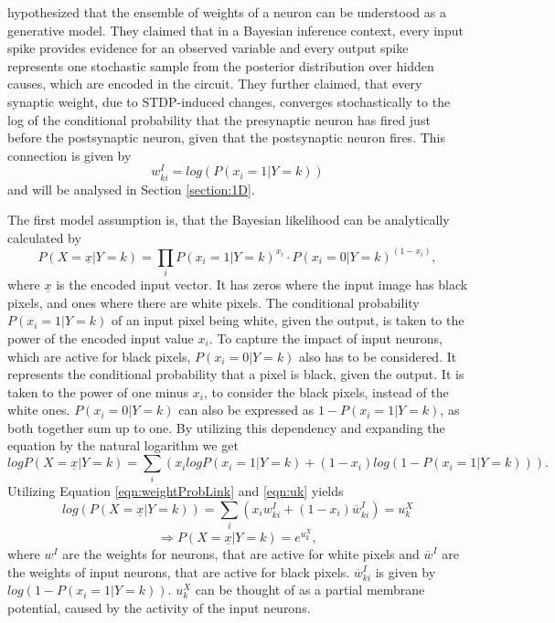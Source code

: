 \citet{nessler} hypothesized that the ensemble of weights of a neuron can be understood as a generative model. They claimed that in a Bayesian inference context, every input spike provides evidence for an observed variable and every output spike represents one stochastic sample from the posterior distribution over hidden causes, which are encoded in the circuit. They further claimed, that every synaptic weight, due to STDP-induced changes,  converges stochastically to the log of the conditional probability that the presynaptic neuron has fired just before the postsynaptic neuron, given that the postsynaptic neuron fires. This connection is given by
\begin{equation}
\label{eqn:weightProbLink}
 w^{I}_{ki} = log(P(x_i = 1 | Y = k))
\end{equation}
and will be analysed in Section \ref{section:1D}.

The first model assumption is, that the Bayesian likelihood can be analytically calculated by
\begin{equation}
\label{eqn:P1}
P(X=\underline{x}|Y=k) = \prod_i P(x_i=1|Y=k)^{x_i} \cdot P(x_i=0|Y=k)^{(1-x_i)},
\end{equation}
where $\underline{x}$ is the encoded input vector. It has zeros where the input image has black pixels, and ones where there are white pixels. The conditional probability $P(x_i=1|Y=k)$ of an input pixel being white, given the output, is taken to the power of the encoded input value $x_i$. To capture the impact of input neurons, which are active for black pixels, $P(x_i=0|Y=k)$ also has to be considered. It represents the conditional probability that a pixel is black, given the output. It is taken to the power of one minus $x_i$, to consider the black pixels, instead of the white ones.
$P(x_i=0|Y=k)$ can also be expressed as $1 - P(x_i=1|Y=k)$, as both together sum up to one. By utilizing this dependency and  expanding the equation by the natural logarithm we get
\begin{equation}
log P(X=\underline{x}|Y=k) = \sum_i (x_i log P(x_i=1|Y=k) + (1-x_i) log (1 - P(x_i=1|Y=k))).
\end{equation}
Utilizing Equation \ref{eqn:weightProbLink} and \ref{eqn:uk}  yields
\begin{equation}
log(P(X=\underline{x}|Y=k)) = \sum_i (x_i w^I_{ki} + (1-x_i)\overline{w}^I_{ki}) = u^X_k
\end{equation}
\begin{equation}
\Rightarrow P(X=\underline{x}|Y=k) = e^{u^X_k},
\end{equation}
where $w^I$ are the weights for neurons, that are active for white pixels and $\overline{w}^I$ are the weights of input neurons, that are active for black pixels. $\overline{w}^I_{ki}$ is given by $log(1 - P(x_i = 1 | Y = k))$. $u^X_k$ can be thought of as a partial membrane potential, caused by the activity of the input neurons.


